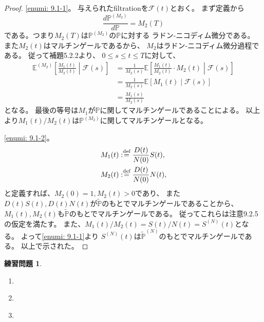 \documentclass[uplatex]{jsarticle}
\theoremstyle{definition}
\newtheorem{prob}[prob]{練習問題}
\def\P{\mathbb{P}}
\def\E{\mathbb{E}}
\def\mcF{\mathcal{F}}
\def\dfn{:\overset{\mbox{{\scriptsize def}}}{=}}
\begin{document}
\begin{proof}
  \ref{enumi: 9.1-1}。
  与えられたfiltrationを\(\mcF(t)\)とおく。
  まず定義から
  \[
  \frac{d\P^{(M_2)}}{d\P} = M_2(T)
  \]
  である。つまり\(M_2(T)\)は\(\P^{(M_2)}\)の\(\P\)に対する
  ラドン-ニコディム微分である。
  また\(M_2(t)\)はマルチンゲールであるから、
  \(M_2\)はラドン-ニコディム微分過程である。
  従って補題5.2.2より、
  \(0\leq s\leq t\leq T\)に対して、
  \begin{align*}
    \E^{(M_2)}\left[ \frac{M_1(t)}{M_2(t)} \middle| \mcF(s)\right]
    &= \frac{1}{M_2(s)}
    \E\left[ \frac{M_1(t)}{M_2(t)}\cdot M_2(t) \middle| \mcF(s)\right] \\
    &= \frac{1}{M_2(s)}\E\left[ M_1(t) \middle| \mcF(s)\right] \\
    &= \frac{M_1(s)}{M_2(s)}
  \end{align*}
  となる。
  最後の等号は\(M_1\)が\(\P\)に関してマルチンゲールであることによる。
  以上より\(M_1(t)/M_2(t)\)は\(\P^{(M_2)}\)に関してマルチンゲールとなる。

  \ref{enumi: 9.1-2}。
  \begin{align*}
    &M_1(t) \dfn \frac{D(t)}{N(0)}S(t), \\
    &M_2(t) \dfn \frac{D(t)}{N(0)}N(t), \\
  \end{align*}
  と定義すれば、\(M_2(0) = 1, M_2(t) > 0\)であり、
  また\(D(t)S(t), D(t)N(t)\)が\(\tilde{\P}\)のもとでマルチンゲールであることから、
  \(M_1(t),M_2(t)\)も\(\tilde{\P}\)のもとでマルチンゲールである。
  従ってこれらは注意9.2.5の仮定を満たす。
  また、\(M_1(t)/M_2(t) = S(t)/N(t) = S^{(N)}(t)\)となる。
  よって\ref{enumi: 9.1-1}より
  \(S^{(N)}(t)\)は\(\tilde{\P}^{(N)}\)のもとでマルチンゲールである。
  以上で示された。
\end{proof}










\begin{prob}\label{prob: 9.2}
  \begin{enumerate}
    \item \label{enumi: 9.2-1}
    \item \label{enumi: 9.2-2}
    \item \label{enumi: 9.2-3}
  \end{enumerate}
\end{prob}
\end{document}
